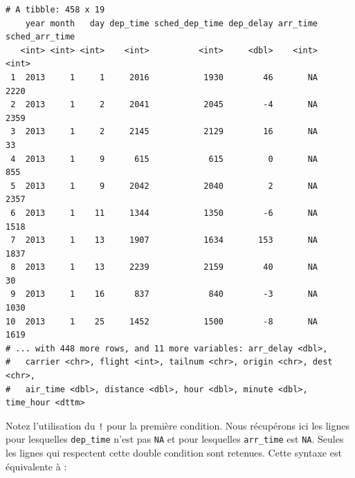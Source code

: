 \documentclass[a4paperpaper,]{article}
\newenvironment{Shaded}{\begin{snugshade}}{\end{snugshade}}
\newcommand{\KeywordTok}[1]{\textcolor[rgb]{0.12,0.11,0.11}{\textbf{#1}}}
\newcommand{\NormalTok}[1]{\textcolor[rgb]{0.12,0.11,0.11}{#1}}
\newcommand{\OperatorTok}[1]{\textcolor[rgb]{0.12,0.11,0.11}{#1}}
\newcommand{\StringTok}[1]{\textcolor[rgb]{0.75,0.01,0.01}{#1}}
\theoremstyle{definition}
\theoremstyle{definition}
\theoremstyle{definition}
\theoremstyle{remark}
\begin{document}
\begin{verbatim}
# A tibble: 458 x 19
    year month   day dep_time sched_dep_time dep_delay arr_time sched_arr_time
   <int> <int> <int>    <int>          <int>     <dbl>    <int>          <int>
 1  2013     1     1     2016           1930        46       NA           2220
 2  2013     1     2     2041           2045        -4       NA           2359
 3  2013     1     2     2145           2129        16       NA             33
 4  2013     1     9      615            615         0       NA            855
 5  2013     1     9     2042           2040         2       NA           2357
 6  2013     1    11     1344           1350        -6       NA           1518
 7  2013     1    13     1907           1634       153       NA           1837
 8  2013     1    13     2239           2159        40       NA             30
 9  2013     1    16      837            840        -3       NA           1030
10  2013     1    25     1452           1500        -8       NA           1619
# ... with 448 more rows, and 11 more variables: arr_delay <dbl>,
#   carrier <chr>, flight <int>, tailnum <chr>, origin <chr>, dest <chr>,
#   air_time <dbl>, distance <dbl>, hour <dbl>, minute <dbl>, time_hour <dttm>
\end{verbatim}

Notez l'utilisation du \texttt{!} pour la première condition. Nous
récupérons ici les lignes pour lesquelles \texttt{dep\_time} n'est pas
\texttt{NA} et pour lesquelles \texttt{arr\_time} est \texttt{NA}.
Seules les lignes qui respectent cette double condition sont retenues.
Cette syntaxe est équivalente à :

\begin{Shaded}
\end{Shaded}
\end{document}
